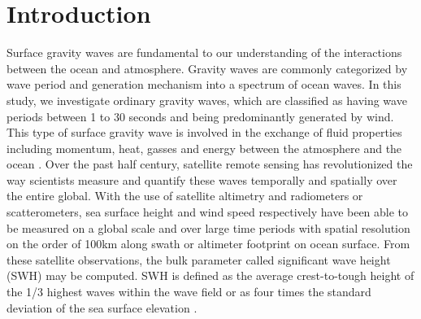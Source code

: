 \documentclass[draft,linenumbers]{agujournal2018}
\begin{document}
%
%
%
%


\section{Introduction}

Surface gravity waves are fundamental to our understanding of the interactions between the ocean and atmosphere. Gravity waves are commonly categorized by wave period and generation mechanism \cite{munk1951origin} into a spectrum of ocean waves. In this study, we investigate ordinary gravity waves, which are classified as having wave periods between 1 to 30 seconds and being predominantly generated by wind. This type of surface gravity wave is involved in the exchange of fluid properties including momentum, heat, gasses and energy between the atmosphere and the ocean \cite{cavaleri2012wind}. Over the past half century, satellite remote sensing has revolutionized the way scientists measure and quantify these waves temporally and spatially over the entire global. With the use of satellite altimetry and radiometers or scatterometers, sea surface height and wind speed respectively have been able to be measured on a global scale and over large time periods with spatial resolution on the order of 100km along swath or altimeter footprint on ocean surface. From these satellite observations, the bulk parameter called significant wave height (SWH) may be computed. SWH is defined as the average crest-to-tough height of the 1/3 highest waves within the wave field or as four times the standard deviation of the sea surface elevation \cite{ardhuin2015ocean}. 
\end{document}
